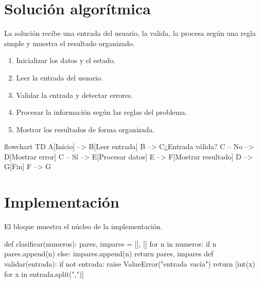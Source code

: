 \documentclass[12pt]{article}
\begin{document}
  \section{Solución algorítmica}
  La solución recibe una entrada del usuario, la valida, la procesa según
  una regla simple y muestra el resultado organizado.

  \begin{tcolorbox}[colback=gray!4, colframe=gray!45, coltitle=black, title={Pasos del algoritmo}]
    \begin{enumerate}[leftmargin=1.2cm]
      \item Inicializar los datos y el estado.
      \item Leer la entrada del usuario.
      \item Validar la entrada y detectar errores.
      \item Procesar la información según las reglas del problema.
      \item Mostrar los resultados de forma organizada.
    \end{enumerate}
  \end{tcolorbox}

  \begin{mermaid}[style=editorial, width=0.55\linewidth, caption={Flujo del algoritmo}]
    flowchart TD
    A[Inicio] --> B[Leer entrada]
    B --> C{¿Entrada válida?}
    C -- No --> D[Mostrar error]
    C -- Sí --> E[Procesar datos]
    E --> F[Mostrar resultado]
    D --> G[Fin]
    F --> G
  \end{mermaid}

  \section{Implementación}
  El bloque muestra el núcleo de la implementación.

  \begin{code}[lang=python, numbers=true]
def clasificar(numeros):
    pares, impares = [], []
    for n in numeros:
        if n %
            pares.append(n)
        else:
            impares.append(n)
    return pares, impares
def validar(entrada):
    if not entrada: raise ValueError("entrada vacía")
    return [int(x) for x in entrada.split(",")]
  \end{code}
\end{document}
